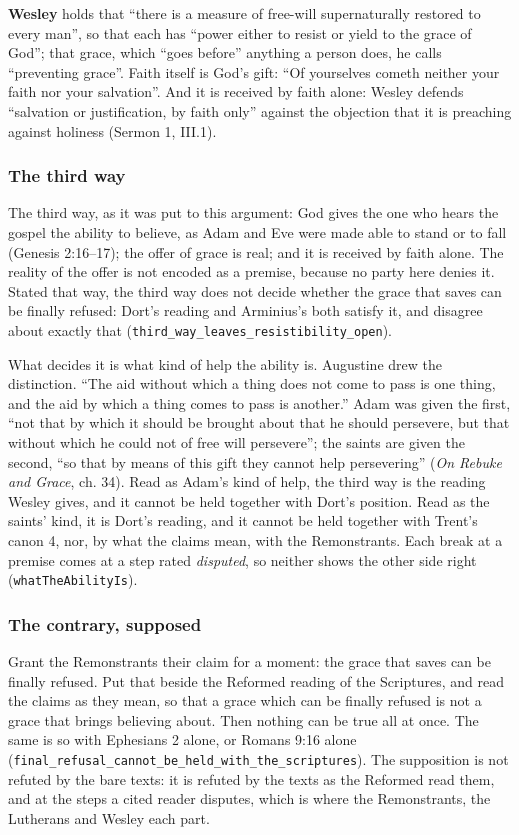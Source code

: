 \documentclass[11pt]{article}
\begin{document}
\textbf{Wesley} holds that “there is a measure of free-will supernaturally restored to every man”, so that each has “power either to resist or yield to the grace of God”; that grace, which “goes before” anything a person does, he calls “preventing grace”. Faith itself is God’s gift: “Of yourselves cometh neither your faith nor your salvation”. And it is received by faith alone: Wesley defends “salvation or justification, by faith only” against the objection that it is preaching against holiness (Sermon 1, III.1).

\subsubsection*{The third way}
The third way, as it was put to this argument: God gives the one who hears the gospel the ability to believe, as Adam and Eve were made able to stand or to fall (Genesis 2:16–17); the offer of grace is real; and it is received by faith alone. The reality of the offer is not encoded as a premise, because no party here denies it. Stated that way, the third way does not decide whether the grace that saves can be finally refused: Dort’s reading and Arminius’s both satisfy it, and disagree about exactly that (\texttt{third\_\allowbreak{}way\_\allowbreak{}leaves\_\allowbreak{}resistibility\_\allowbreak{}open}).

What decides it is what kind of help the ability is. Augustine drew the distinction. “The aid without which a thing does not come to pass is one thing, and the aid by which a thing comes to pass is another.” Adam was given the first, “not that by which it should be brought about that he should persevere, but that without which he could not of free will persevere”; the saints are given the second, “so that by means of this gift they cannot help persevering” (\emph{On Rebuke and Grace}, ch. 34). Read as Adam’s kind of help, the third way is the reading Wesley gives, and it cannot be held together with Dort’s position. Read as the saints’ kind, it is Dort’s reading, and it cannot be held together with Trent’s canon 4, nor, by what the claims mean, with the Remonstrants. Each break at a premise comes at a step rated \emph{disputed}, so neither shows the other side right (\texttt{what\allowbreak{}The\allowbreak{}Ability\allowbreak{}Is}).

\subsubsection*{The contrary, supposed}
Grant the Remonstrants their claim for a moment: the grace that saves can be finally refused. Put that beside the Reformed reading of the Scriptures, and read the claims as they mean, so that a grace which can be finally refused is not a grace that brings believing about. Then nothing can be true all at once. The same is so with Ephesians 2 alone, or Romans 9:16 alone (\texttt{final\_\allowbreak{}refusal\_\allowbreak{}cannot\_\allowbreak{}be\_\allowbreak{}held\_\allowbreak{}with\_\allowbreak{}the\_\allowbreak{}scriptures}). The supposition is not refuted by the bare texts: it is refuted by the texts as the Reformed read them, and at the steps a cited reader disputes, which is where the Remonstrants, the Lutherans and Wesley each part.
\end{document}
